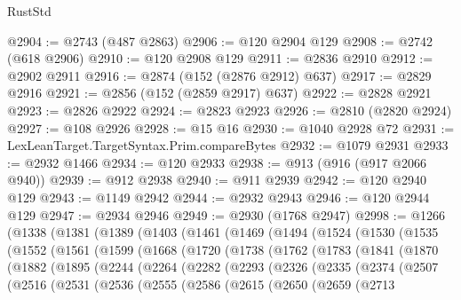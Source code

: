 \begin{lexlean}{RustStd}
\begin{coremodule}
@2904 := @2743 (@487 @2863)
@2906 := @120 @2904 @129
@2908 := @2742 (@618 @2906)
@2910 := @120 @2908 @129
@2911 := @2836 @2910
@2912 := @2902 @2911
@2916 := @2874 (@152 (@2876 @2912) @637)
@2917 := @2829 @2916
@2921 := @2856 (@152 (@2859 @2917) @637)
@2922 := @2828 @2921
@2923 := @2826 @2922
@2924 := @2823 @2923
@2926 := @2810 (@2820 @2924)
@2927 := @108 @2926
@2928 := @15 @16
@2930 := @1040 @2928 @72
@2931 := LexLeanTarget.TargetSyntax.Prim.compareBytes
@2932 := @1079 @2931
@2933 := @2932 @1466
@2934 := @120 @2933
@2938 := @913 (@916 (@917 @2066 @940))
@2939 := @912 @2938
@2940 := @911 @2939
@2942 := @120 @2940 @129
@2943 := @1149 @2942
@2944 := @2932 @2943
@2946 := @120 @2944 @129
@2947 := @2934 @2946
@2949 := @2930 (@1768 @2947)
@2998 := @1266
    (@1338
      (@1381
        (@1389
          (@1403
            (@1461
              (@1469
                (@1494
                  (@1524
                    (@1530
                      (@1535
                        (@1552
                          (@1561
                            (@1599
                              (@1668
                                (@1720
                                  (@1738
                                    (@1762
                                      (@1783
                                        (@1841
                                          (@1870
                                            (@1882
                                              (@1895
                                                (@2244
                                                  (@2264
                                                    (@2282
                                                      (@2293
                                                        (@2326
                                                          (@2335
                                                            (@2374
                                                              (@2507
                                                                (@2516
                                                                  (@2531
                                                                    (@2536
                                                                      (@2555
                                                                        (@2586
                                                                          (@2615
                                                                            (@2650
                                                                              (@2659
                                                                                (@2713

\end{coremodule}
\end{lexlean}

